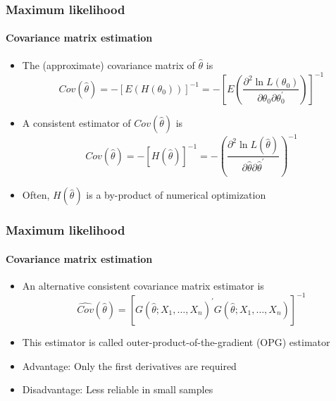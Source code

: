 \documentclass[notes=show]{beamer}
\begin{document}
\begin{frame}\frametitle{Maximum likelihood}\framesubtitle{Covariance matrix estimation}
\begin{itemize}
    \item The (approximate) covariance matrix of $\hat{\theta}$ is
    \begin{equation*}
        Cov(\hat{\theta})=-\left[ E\left( H\left( \theta _{0}\right) \right) \right]^{-1}=-\left[ E\left( \frac{\partial ^{2}\ln L(\theta _{0})}{\partial \theta_{0}\partial \theta _{0}^{\prime }}\right) \right] ^{-1}
    \end{equation*}
    \item A consistent estimator of $Cov(\hat{\theta})$ is
    \begin{equation*}
        \widehat{Cov}(\hat{\theta})=-\left[ H(\hat{\theta})\right] ^{-1}=-\left(\frac{\partial ^{2}\ln L(\hat{\theta})}{\partial \hat{\theta}\partial \hat{\theta}^{\prime }}\right) ^{-1}
    \end{equation*}
    \item Often, $H(\hat{\theta})$ is a by-product of numerical optimization
\end{itemize}
\end{frame}


\begin{frame}\frametitle{Maximum likelihood}\framesubtitle{Covariance matrix estimation}
\begin{itemize}
    \item An alternative consistent covariance matrix estimator is
    \begin{equation*}
        \widehat{Cov}(\hat{\theta})=\left[ G(\hat{\theta};X_{1},\ldots,X_{n})^{\prime }G(\hat{\theta};X_{1},\ldots ,X_{n})\right] ^{-1}
    \end{equation*}
    \item This estimator is called outer-product-of-the-gradient (OPG) estimator
    \item Advantage: Only the first derivatives are required
    \item Disadvantage: Less reliable in small samples
\end{itemize}
\end{frame}
\end{document}
